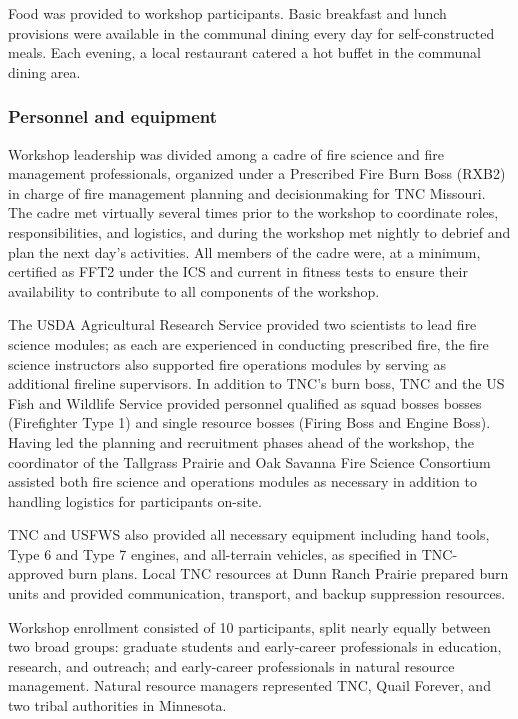\documentclass[fire,article,submit,moreauthors,pdftex]{Definitions/mdpi}
\begin{document}
Food was provided to workshop participants.
Basic breakfast and lunch provisions were available in the communal dining every day for self-constructed meals.
Each evening, a local restaurant catered a hot buffet in the communal dining area.

\subsubsection{Personnel and equipment}

Workshop leadership was divided among a cadre of fire science and fire management professionals, organized under a Prescribed Fire Burn Boss (RXB2) in charge of fire management planning and decisionmaking for TNC Missouri.
The cadre met virtually several times prior to the workshop to coordinate roles, responsibilities, and logistics, and during the workshop met nightly to debrief and plan the next day's activities.
All members of the cadre were, at a minimum, certified as FFT2 under the ICS and current in fitness tests to ensure their availability to contribute to all components of the workshop.

The USDA Agricultural Research Service provided two scientists to lead fire science modules; as each are experienced in conducting prescribed fire, the fire science instructors also supported fire operations modules by serving as additional fireline supervisors.
In addition to TNC's burn boss, TNC and the US Fish and Wildlife Service provided personnel qualified as squad bosses bosses (Firefighter Type 1) and single resource bosses (Firing Boss and Engine Boss).
Having led the planning and recruitment phases ahead of the workshop, the coordinator of the Tallgrass Prairie and Oak Savanna Fire Science Consortium assisted both fire science and operations modules as necessary in addition to handling logistics for participants on-site.

TNC and USFWS also provided all necessary equipment including hand tools, Type 6 and Type 7 engines, and all-terrain vehicles, as specified in TNC-approved burn plans.
Local TNC resources at Dunn Ranch Prairie prepared burn units and provided communication, transport, and backup suppression resources.

Workshop enrollment consisted of 10 participants, split nearly equally between two broad groups: graduate students and early-career professionals in education, research, and outreach; and early-career professionals in natural resource management.
Natural resource managers represented TNC, Quail Forever, and two tribal authorities in Minnesota.
\end{document}
